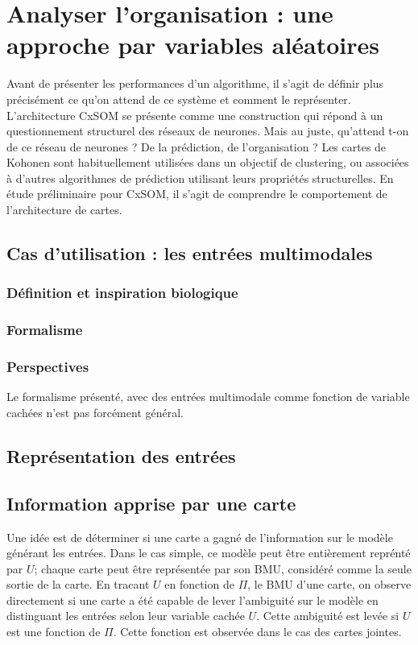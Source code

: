 \chapter{Analyser l'organisation : une approche par variables aléatoires}
\graphicspath{{04-Analyse/}}
Avant de présenter les performances d'un algorithme, il s'agit de définir plus précisément ce qu'on attend de ce système et comment le représenter. L'architecture CxSOM se présente comme une construction qui répond à un questionnement structurel des réseaux de neurones. Mais au juste, qu'attend t-on de ce réseau de neurones ? De la prédiction, de l'organisation ? Les cartes de Kohonen sont habituellement utilisées dans un objectif de clustering, ou associées à d'autres algorithmes de prédiction utilisant leurs propriétés structurelles. En étude préliminaire pour CxSOM, il s'agit de comprendre le comportement de l'architecture de cartes.

\section{Cas d'utilisation : les entrées multimodales}



\subsection{Définition et inspiration biologique}

\subsection{Formalisme}


\subsection{Perspectives}

Le formalisme présenté, avec des entrées multimodale comme fonction de variable cachées n'est pas forcément général.  

\section{Représentation des entrées}


\section{Information apprise par une carte}

Une idée est de déterminer si une carte a gagné de l'information sur le modèle générant les entrées. Dans le cas simple, ce modèle peut être entièrement reprénté par $U$; chaque carte peut être représentée par son BMU, considéré comme la seule sortie de la carte. 
En tracant $U$ en fonction de $\Pi$, le BMU d'une carte, on observe directement si une carte a été capable de lever l'ambiguité sur le modèle en distinguant les entrées selon leur variable cachée $U$. Cette ambiguité est levée si $U$ est une fonction de $\Pi$. Cette fonction est observée dans le cas des cartes jointes.

